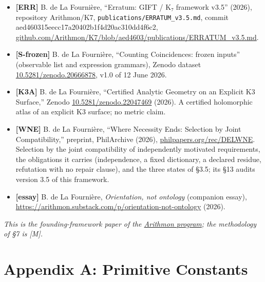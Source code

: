 \documentclass[11pt,a4paper]{article}
\begin{document}
\begin{itemize}
  \textbf{{[}M{]}} B. de La Fournière, ``A reproducible standard for arithmetic coincidence claims in fundamental physics,'' Zenodo \href{https://doi.org/10.5281/zenodo.20728964}{10.5281/zenodo.20728964} (2026). The Sieve protocol and the scorecard of its four null tests for the K₇ relations.
\item
  \textbf{{[}ERR{]}} B. de La Fournière, ``Erratum: GIFT / K₇ framework v3.5'' (2026), repository Arithmon/K7, \texttt{publications/\allowbreak{}ERRATUM\_\allowbreak{}v3.\allowbreak{}5.\allowbreak{}md}, commit aed460315eecc17a20402b1f4d20ac310dd4f6c2, \href{https://github.com/Arithmon/K7/blob/aed460315eecc17a20402b1f4d20ac310dd4f6c2/publications/ERRATUM_v3.5.md}{github.com/Arithmon/K7/blob/aed4603/publications/ERRATUM\_\allowbreak{}v3.5.md}.
\item
  \textbf{{[}S-frozen{]}} B. de La Fournière, ``Counting Coincidences: frozen inputs'' (observable list and expression grammars), Zenodo dataset \href{https://doi.org/10.5281/zenodo.20666878}{10.5281/zenodo.20666878}, v1.0 of 12 June 2026.
\item
  \textbf{{[}K3A{]}} B. de La Fournière, ``Certified Analytic Geometry on an Explicit K3 Surface,'' Zenodo \href{https://doi.org/10.5281/zenodo.22047469}{10.5281/zenodo.22047469} (2026). A certified holomorphic atlas of an explicit K3 surface; no metric claim.
\item
  \textbf{{[}WNE{]}} B. de La Fournière, ``Where Necessity Ends: Selection by Joint Compatibility,'' preprint, PhilArchive (2026), \href{https://philpapers.org/rec/DELWNE}{philpapers.org/rec/DELWNE}. Selection by the joint compatibility of independently motivated requirements, the obligations it carries (independence, a fixed dictionary, a declared residue, refutation with no repair clause), and the three states of §3.5; its §13 audits version 3.5 of this framework.
\item
  \textbf{{[}essay{]}} B. de La Fournière, \emph{Orientation, not ontology} (companion essay), \url{https://arithmon.substack.com/p/orientation-not-ontology} (2026).
\end{itemize}

\emph{This is the founding-framework paper of the \href{https://arithmon.com}{Arithmon program}; the methodology of §7 is {[}M{]}.}

\section{Appendix A: Primitive Constants}\label{appendix-a-primitive-constants}
\end{document}
